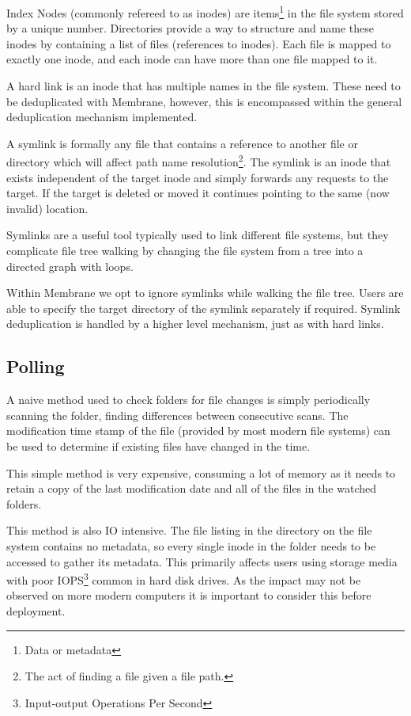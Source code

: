\documentclass[11pt, a4paper, twoside]{report}
\begin{document}
Index Nodes (commonly refereed to as inodes) are items\footnote{Data or metadata} in the file system stored by a unique number. Directories provide a way to structure and name these inodes by containing a list of files (references to inodes). Each file is mapped to exactly one inode, and each inode can have more than one file mapped to it. \citep{bar2001linux}

A hard link is an inode that has multiple names in the file system. These need to be deduplicated with Membrane, however, this is encompassed within the general deduplication mechanism implemented.

A symlink is formally any file that contains a reference to another file or directory which will affect path name resolution\footnote{The act of finding a file given a file path.}. The symlink is an inode that exists independent of the target inode and simply forwards any requests to the target. If the target is deleted or moved it continues pointing to the same (now invalid) location. \citep{yue2011unix}

Symlinks are a useful tool typically used to link different file systems, but they complicate file tree walking by changing the file system from a tree into a directed graph with loops.

Within Membrane we opt to ignore symlinks while walking the file tree. Users are able to specify the target directory of the symlink separately if required. Symlink deduplication is handled by a higher level mechanism, just as with hard links.

\subsection{Polling}

A naive method used to check folders for file changes is simply periodically scanning the folder, finding differences between consecutive scans. The modification time stamp of the file (provided by most modern file systems) can be used to determine if existing files have changed in the time.

This simple method is very expensive, consuming a lot of memory as it needs to retain a copy of the last modification date and all of the files in the watched folders.

This method is also IO intensive. The file listing in the directory on the file system contains no metadata, so every single inode in the folder needs to be accessed to gather its metadata. This primarily affects users using storage media with poor IOPS\footnote{Input-output Operations Per Second} common in hard disk drives. As the impact may not be observed on more modern computers it is important to consider this before deployment. \citep{mansurov2017storage}
\end{document}
